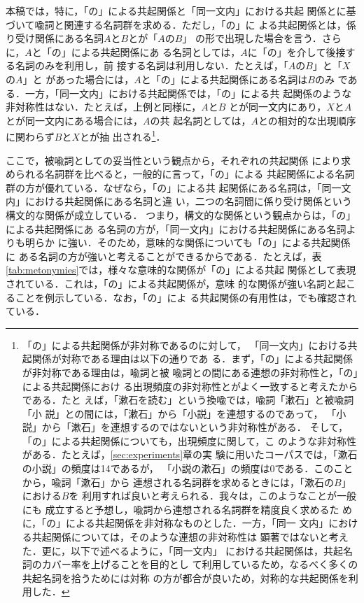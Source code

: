 本稿では，特に，「の」による共起関係と「同一文内」における共起
関係とに基づいて喩詞と関連する名詞群を求める．ただし，「の」に
よる共起関係とは，係り受け関係にある名詞$A$と$B$とが「$A$の$B$」
の形で出現した場合を言う．さらに，$A$と「の」による共起関係にあ
る名詞としては，$A$に「の」を介して後接する名詞のみを利用し，前
接する名詞は利用しない．たとえば，「$A$の$B$」と「$X$の$A$」と
があった場合には，$A$と「の」による共起関係にある名詞は$B$のみ
である．一方，「同一文内」における共起関係では，「の」による共
起関係のような非対称性はない．たとえば，上例と同様に，$A$と$B$
とが同一文内にあり，$X$と$A$とが同一文内にある場合には，$A$の共
起名詞としては，$A$との相対的な出現順序に関わらず$B$と$X$とが抽
出される\footnote{「の」による共起関係が非対称であるのに対して，
  「同一文内」における共起関係が対称である理由は以下の通りであ
  る．まず，「の」による共起関係が非対称である理由は，喩詞と被
  喩詞との間にある連想の非対称性と，「の」による共起関係におけ
  る出現頻度の非対称性とがよく一致すると考えたからである．たと
  えば，「漱石を読む」という換喩では，喩詞「漱石」と被喩詞「小
  説」との間には，「漱石」から「小説」を連想するのであって，
  「小説」から「漱石」を連想するのではないという非対称性がある．
  そして，「の」による共起関係についても，出現頻度に関して，こ
  のような非対称性がある．たとえば，\ref{sec:experiments}章の実
  験に用いたコーパスでは，「漱石の小説」の頻度は14であるが，
  「小説の漱石」の頻度は0である．このことから，喩詞「漱石」から
  連想される名詞群を求めるときには，「漱石の$B$」における$B$を
  利用すれば良いと考えられる．我々は，このようなことが一般にも
  成立すると予想し，喩詞から連想される名詞群を精度良く求めるた
  めに，「の」による共起関係を非対称なものとした．一方，「同一
  文内」における共起関係については，そのような連想の非対称性は
  顕著ではないと考えた．更に，以下で述べるように，「同一文内」
  における共起関係は，共起名詞のカバー率を上げることを目的とし
  て利用しているため，なるべく多くの共起名詞を拾うためには対称
  の方が都合が良いため，対称的な共起関係を利用した．}．

ここで，被喩詞としての妥当性という観点から，それぞれの共起関係
により求められる名詞群を比べると，一般的に言って，「の」による
共起関係による名詞群の方が優れている．なぜなら，「の」による共
起関係にある名詞は，「同一文内」における共起関係にある名詞と違
い，二つの名詞間に係り受け関係という構文的な関係が成立している．
つまり，構文的な関係という観点からは，「の」による共起関係にあ
る名詞の方が，「同一文内」における共起関係にある名詞よりも明らか
に強い．そのため，意味的な関係についても「の」による共起関係に
ある名詞の方が強いと考えることができるからである．たとえば，表
\ref{tab:metonymies}では，様々な意味的な関係が「の」による共起
関係として表現されている．これは，「の」による共起関係が，意味
的な関係が強い名詞と起こることを例示している．なお，「の」によ
る共起関係の有用性は，\cite{murata97}でも確認されている．

